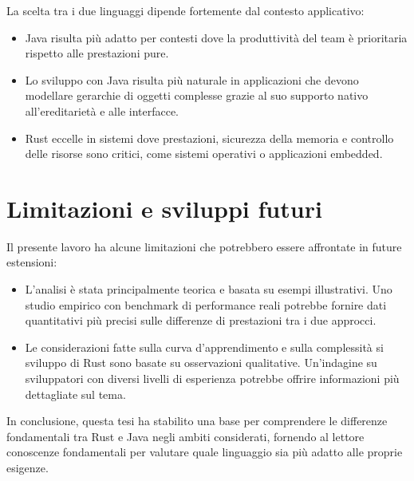 La scelta tra i due linguaggi dipende fortemente dal contesto applicativo:
\begin{itemize}
    \item Java risulta più adatto per contesti dove la produttività del team è prioritaria rispetto alle prestazioni pure.
    \item Lo sviluppo con Java risulta più naturale in applicazioni che devono modellare gerarchie di oggetti complesse grazie al suo supporto nativo all'ereditarietà e alle interfacce.
    \item Rust eccelle in sistemi dove prestazioni, sicurezza della memoria e controllo delle risorse sono critici, come sistemi operativi o applicazioni embedded.
\end{itemize}

\section{Limitazioni e sviluppi futuri}
Il presente lavoro ha alcune limitazioni che potrebbero essere affrontate in future estensioni:
\begin{itemize}
    \item L'analisi è stata principalmente teorica e basata su esempi illustrativi. Uno studio empirico con benchmark di performance reali potrebbe fornire dati quantitativi più precisi sulle differenze di prestazioni tra i due approcci.
    \item Le considerazioni fatte sulla curva d'apprendimento e sulla complessità si sviluppo di Rust sono basate su osservazioni qualitative. Un'indagine su sviluppatori con diversi livelli di esperienza potrebbe offrire informazioni più dettagliate sul tema.
\end{itemize}
In conclusione, questa tesi ha stabilito una base per comprendere le differenze fondamentali tra Rust e Java negli ambiti considerati, fornendo al lettore conoscenze fondamentali per valutare quale linguaggio sia più adatto alle proprie esigenze.